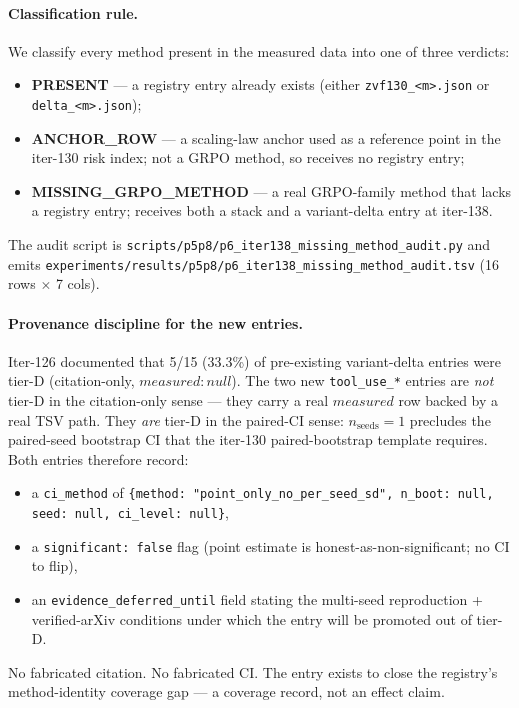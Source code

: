 \paragraph{Classification rule.}
We classify every method present in the measured data into one of three
verdicts:
\begin{itemize}
\item \textbf{PRESENT} --- a registry entry already exists (either
  \texttt{zvf130\_<m>.json} or \texttt{delta\_<m>.json});
\item \textbf{ANCHOR\_ROW} --- a scaling-law anchor used as a
  reference point in the iter-130 risk index; not a GRPO method, so
  receives no registry entry;
\item \textbf{MISSING\_GRPO\_METHOD} --- a real GRPO-family method
  that lacks a registry entry; receives both a stack and a
  variant-delta entry at iter-138.
\end{itemize}
The audit script is
\texttt{scripts/p5p8/p6\_iter138\_missing\_method\_audit.py} and
emits \texttt{experiments/results/p5p8/p6\_iter138\_missing\_method\_audit.tsv}
(16 rows $\times$ 7 cols).

\paragraph{Provenance discipline for the new entries.}
Iter-126 documented that 5/15 (33.3\%) of pre-existing variant-delta
entries were tier-D (citation-only, $\mathit{measured}: \mathit{null}$).
The two new \texttt{tool\_use\_*} entries are \emph{not} tier-D in the
citation-only sense --- they carry a real $\mathit{measured}$ row
backed by a real TSV path. They \emph{are} tier-D in the paired-CI
sense: $n_{\text{seeds}}=1$ precludes the paired-seed bootstrap CI
that the iter-130 paired-bootstrap template requires. Both entries
therefore record:
\begin{itemize}
\item a \texttt{ci\_method} of
  \texttt{\{method: "point\_only\_no\_per\_seed\_sd", n\_boot: null,
  seed: null, ci\_level: null\}},
\item a \texttt{significant: false} flag (point estimate is
  honest-as-non-significant; no CI to flip),
\item an \texttt{evidence\_deferred\_until} field stating the
  multi-seed reproduction + verified-arXiv conditions under which
  the entry will be promoted out of tier-D.
\end{itemize}
No fabricated citation. No fabricated CI. The entry exists to close
the registry's method-identity coverage gap --- a coverage record,
not an effect claim.

